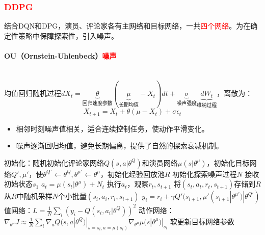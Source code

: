 \documentclass[
12pt, %
a4paper, 
oneside, %
]{scrartcl}
\begin{document}
\subsubsection[DDPG]{\textcolor{red}{DDPG}}
结合DQN和DPG，演员、评论家各有主网络和目标网络，一共\textcolor{red}{四个网络}。为在确定性策略中保障探索性，引入噪声。
\paragraph{OU（Ornstein-Uhlenbeck）\textcolor{red}{噪声}}~\\

均值回归随机过程$ dX_t = \underbrace{\theta}_{\text{回归速度参数}}(\underbrace{\mu}_{\text{长期均值}} - X_t)dt + \underbrace{\sigma}_{\text{噪声强度}} \underbrace{dW_t}_{\text{维纳过程}} $，离散为：
$$ X_{t + 1} = X_t + \theta(\mu - X_t) + \sigma \epsilon_t $$
\begin{itemize}
\item 相邻时刻噪声值相关，适合连续控制任务，使动作平滑变化。
\item 噪声逐渐回归均值，避免长期偏离，提供了自然的探索衰减机制。
\end{itemize}
\begin{myalgorithm}[DDPG]
\State 初始化：随机初始化评论家网络$ Q(s, a|\theta^Q) $和演员网络$ \mu(s|\theta^\mu) $，初始化目标网络$ Q', \mu' $，使$ \theta^{Q'} \gets \theta^Q, \theta^{\mu'} \gets \theta^\mu $，初始化经验回放池$ R $
\State 初始化探索噪声过程$ N $
\State 接收初始状态$ s_1 $
\State $ a_t = \mu(s_t|\theta^\mu) + N_t $ 
\State 执行$ a_t $，观察$ r_t, s_{t + 1} $
\State 将$ (s_t, a_t, r_t, s_{t + 1}) $存储到$ R $ 
\State 从$ R $中随机采样$ N $个小批量$ (s_i, a_i, r_i, s_{i + 1}) $
\State $ y_i = r_i + \gamma Q'(s_{i + 1}, \mu'(s_{i + 1}|\theta^{\mu'})|\theta^{Q'}) $ 
\State 值网络：$ L = \frac{1}{N}\sum_i (y_i - Q(s_i, a_i|\theta^Q))^2 $ 
\State 动作网络：$\nabla_{\theta^\mu} J \approx \frac{1}{N} \sum_i \nabla_a Q(s, a|\theta^Q)|_{s = s_i, a = \mu(s_i)} \nabla_{\theta^\mu} \mu(s|\theta^\mu)|_{s_i} $ 
\State 软更新目标网络参数
\EndFor
\EndFor
\end{myalgorithm}
\end{document}
